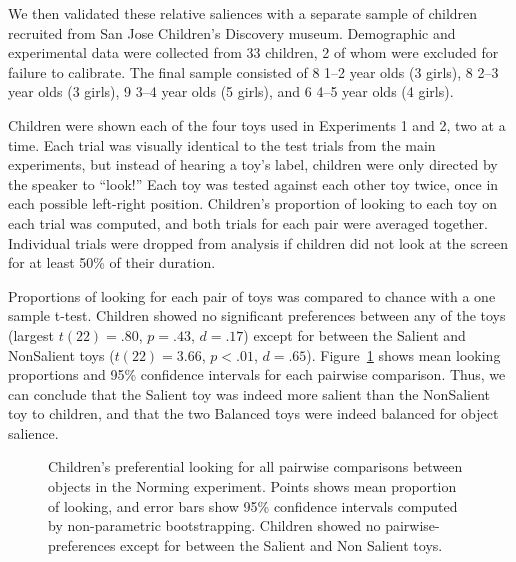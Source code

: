 \documentclass[man,floatsintext]{apa6}
\begin{document}
We then validated these relative saliences with a separate sample of children recruited from San Jose Children's Discovery museum. Demographic and experimental data were collected from 33 children, 2 of whom were excluded for failure to calibrate. The final sample consisted of 8 1--2 year olds (3 girls), 8 2--3 year olds (3 girls), 9 3--4 year olds (5 girls), and 6 4--5 year olds (4 girls).

Children were shown each of the four toys used in Experiments 1 and 2, two at a time. Each trial was visually identical to the test trials from the main experiments, but instead of hearing a toy's label, children were only directed by the speaker to ``look!'' Each toy was tested against each other toy twice, once in each possible left-right position. Children's proportion of looking to each toy on each trial was computed, and both trials for each pair were averaged together. Individual trials were dropped from analysis if children did not look at the screen for at least 50\% of their duration.

Proportions of looking for each pair of toys was compared to chance with a one sample t-test. Children showed no significant preferences between any of the toys (largest $t(22) = .80$, $p = .43$, $d =.17$) except for between the Salient and NonSalient toys ($t(22) = 3.66$, $p < .01$, $d =.65$). Figure~\ref{fig:kid_norm} shows mean looking proportions and 95\% confidence intervals for each pairwise comparison. Thus, we can conclude that the Salient toy was indeed more salient than the NonSalient toy to children, and that the two Balanced toys were indeed balanced for object salience.

\begin{figure}[tb]
	\caption{\label{fig:kid_norm} Children's preferential looking for all pairwise comparisons between objects in the Norming experiment. Points shows mean proportion of looking, and error bars show 95\% confidence intervals computed by non-parametric bootstrapping. Children showed no pairwise-preferences except for between the Salient and Non Salient toys.}
\end{figure}



\end{document}
